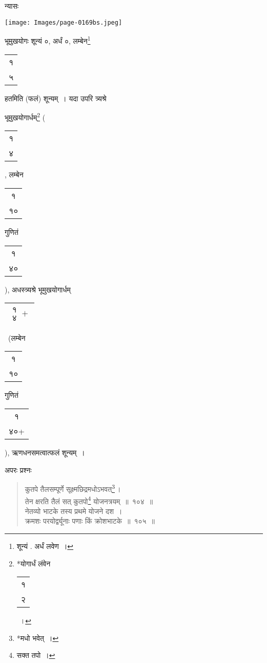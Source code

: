\documentclass[10pt, openany]{book}
\begin{document}
{{{{न्यासः\textendash \,}
\vspace{-2mm}

\hspace{15mm} \texttt{[image: Images/page-0169bs.jpeg]}
\vspace{5mm}

{भूमुखयोगः शून्यं ०, अर्धं ०, लम्बेन\renewcommand{\thefootnote}{२}\footnote{शून्यं . अर्धं लवेण~।} \begin{tabular}{|c|} १ \\५\\\hline \end{tabular}  हतमिति (फलं) शून्यम्~। यदा उपरि त्र्यश्रे}
{भूमुखयोगार्धम्\renewcommand{\thefootnote}{३}\footnote{*योगार्धं लंवेन \begin{tabular}{|c|} १ \\२\end{tabular}~।} \bigg(\begin{tabular}{c}१\\ ४\end{tabular}, लम्बेन\begin{tabular}{c}१\\ १०\end{tabular}गुणितं\begin{tabular}{c}१\\ ४०\end{tabular}\bigg), अधस्त्र्यश्रे
भूमुखयोगार्धम् \begin{tabular}{|c|}$\begin{matrix}
\mbox{{१}}\\
\mbox{{४}}
\end{matrix}+$\\\hline \end{tabular}~\bigg(लम्बेन\begin{tabular}{c}१\\ १०\end{tabular}}
{गुणितं\begin{tabular}{c}१\\ ४०+\end{tabular}\bigg), ऋणधनसमत्वात्फलं शून्यम्~।}
\vspace{4mm}

{अपरः प्रश्नः\textendash}

 \label{e104}
\begin{quote}
    
{\eg कुतपे तैलसम्पूर्णे सूक्ष्मछिद्रमधोऽभवत्\renewcommand{\thefootnote}{४}\footnote{*मधो भवेत्~।}\,। \\
 तेन क्षरति तैलं सत् कुतपो\renewcommand{\thefootnote}{५}\footnote{सक्त तपो~।} योजनत्रयम्~॥~१०४~॥ \\
 नेतव्यो भाटके तस्य प्रथमे योजने दश~।\\
 क्रमशः परयोर्द्व्यूनाः पणाः किं क्रोशभाटके~॥~१०५~॥}\end{quote}

}}}
\end{document}
